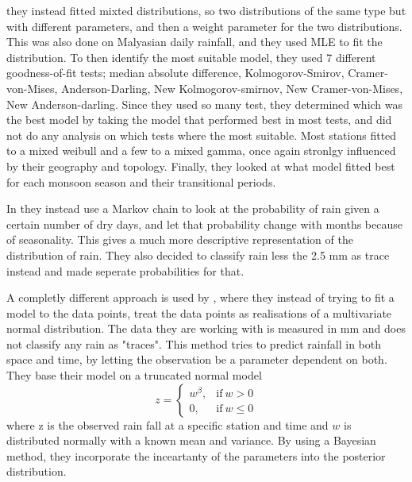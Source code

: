 \documentclass{article}
\begin{document}
	\cite{MixedDistr} they instead fitted mixted distributions, so two distributions of the same type but with different parameters, and then a weight parameter for the two distributions. This was also done on Malyasian daily rainfall, and they used MLE to fit the distribution. To then identify the most suitable model, they used 7 different goodness-of-fit tests; median absolute difference, Kolmogorov-Smirov, Cramer-von-Mises, Anderson-Darling, New Kolmogorov-smirnov, New Cramer-von-Mises, New Anderson-darling. Since they used so many test, they determined which was the best model by taking the model that performed best in most tests, and did not do any analysis on which tests where the most suitable. Most stations fitted to a mixed weibull and a few to a mixed gamma, once again stronlgy influenced by their geography and topology. Finally, they looked at what model fitted best for each monsoon season and their transitional periods. 
	
	In \cite{Markov} they instead use a Markov chain to look at the probability of rain given a certain number of dry days, and let that probability change with months because of seasonality. This gives a much more descriptive representation of the distribution of rain. They also decided to classify rain less the 2.5 mm as trace instead and made seperate probabilities for that. 
	
	A completly different approach is used by \cite{Bayesian}, where they instead of trying to fit a model to the data points, treat the data points as realisations of a multivariate normal distribution. The data they are working with is measured in mm and does not classify any rain as "traces". This method tries to predict rainfall in both space and time, by letting the observation be a parameter dependent on both. They base their model on a truncated normal model
	\begin{equation}
	z =
	\begin{cases}
	w^\beta,& \text{if} \ w > 0 \\
	0, & \text{if} \ w  \leq 0 
	\end{cases}
	\end{equation}
	where z is the observed rain fall at a specific station and time and $w$ is distributed normally with a known mean and variance. By using a Bayesian method, they incorporate the inceartanty of the parameters into the posterior distribution. 
	
\end{document}

